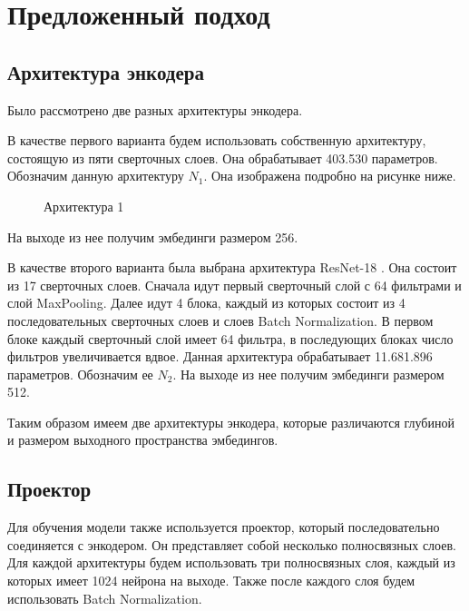 \section{Предложенный подход}
\label{sec:Chapter4} 

\subsection{Архитектура энкодера}

Было рассмотрено две разных архитектуры энкодера.

В качестве первого варианта будем использовать собственную архитектуру, состоящую из пяти сверточных слоев. Она обрабатывает 403.530 параметров. Обозначим данную архитектуру $N_1$. Она изображена подробно на рисунке ниже.

\begin{figure}[H]
        \caption{Архитектура 1}
        \label{encoder_arch}
\end{figure} 

На выходе из нее получим эмбединги размером 256.

В качестве второго варианта была выбрана архитектура ResNet-18 \cite{ResNet18}. Она состоит из 17 сверточных слоев. Сначала идут первый сверточный слой с 64 фильтрами и слой MaxPooling. Далее идут 4 блока, каждый из которых состоит из 4 последовательных сверточных слоев и слоев Batch Normalization. В первом блоке каждый сверточный слой имеет 64 фильтра, в последующих блоках число фильтров увеличивается вдвое. Данная архитектура обрабатывает 11.681.896 параметров. Обозначим ее $N_2$. На выходе из нее получим эмбединги размером 512. 

Таким образом имеем две архитектуры энкодера, которые различаются глубиной и размером выходного пространства эмбедингов. 

\subsection{Проектор}

Для обучения модели также используется проектор, который последовательно соединяется с энкодером. Он представляет собой несколько полносвязных слоев. Для каждой архитектуры будем использовать три полносвязных слоя, каждый из которых имеет 1024 нейрона на выходе. Также после каждого слоя будем использовать Batch Normalization.
